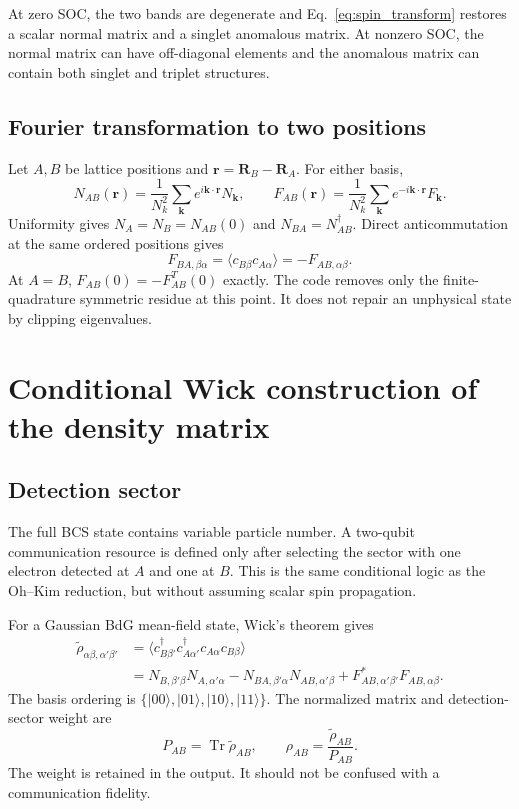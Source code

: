 \documentclass[11pt]{article}
\newcommand{\tr}{\operatorname{Tr}}
\newcommand{\kb}{\mathbf k}
\newcommand{\rr}{\mathbf r}
\begin{document}
At zero SOC, the two bands are degenerate and Eq.~\eqref{eq:spin_transform} restores a scalar normal matrix and a singlet anomalous matrix. At nonzero SOC, the normal matrix can have off-diagonal elements and the anomalous matrix can contain both singlet and triplet structures.

\subsection{Fourier transformation to two positions}

Let $A,B$ be lattice positions and $\rr=\mathbf R_B-\mathbf R_A$. For either basis,
\begin{equation}
N_{AB}(\rr)=\frac1{N_k^2}\sum_{\kb}e^{i\kb\cdot\rr}N_{\kb},
\qquad
F_{AB}(\rr)=\frac1{N_k^2}\sum_{\kb}e^{-i\kb\cdot\rr}F_{\kb}.
\label{eq:real_space}
\end{equation}
Uniformity gives $N_A=N_B=N_{AB}(0)$ and $N_{BA}=N_{AB}^{\dagger}$. Direct anticommutation at the same ordered positions gives
\begin{equation}
F_{BA,\beta\alpha}=\langle c_{B\beta}c_{A\alpha}\rangle=-F_{AB,\alpha\beta}.
\label{eq:FBA}
\end{equation}
At $A=B$, $F_{AB}(0)=-F_{AB}^{T}(0)$ exactly. The code removes only the finite-quadrature symmetric residue at this point. It does not repair an unphysical state by clipping eigenvalues.

\section{Conditional Wick construction of the density matrix}
\label{sec:wick}

\subsection{Detection sector}

The full BCS state contains variable particle number. A two-qubit communication resource is defined only after selecting the sector with one electron detected at $A$ and one at $B$. This is the same conditional logic as the Oh--Kim reduction, but without assuming scalar spin propagation.

For a Gaussian BdG mean-field state, Wick's theorem gives
\begin{align}
\widetilde\rho_{\alpha\beta,\alpha'\beta'}
&=\langle c_{B\beta'}^{\dagger}c_{A\alpha'}^{\dagger}
 c_{A\alpha}c_{B\beta}\rangle\nonumber\\
&=N_{B,\beta'\beta}N_{A,\alpha'\alpha}
-N_{BA,\beta'\alpha}N_{AB,\alpha'\beta}
+F_{AB,\alpha'\beta'}^{*}F_{AB,\alpha\beta}.
\label{eq:wick_full}
\end{align}
The basis ordering is $\{|00\rangle,|01\rangle,|10\rangle,|11\rangle\}$. The normalized matrix and detection-sector weight are
\begin{equation}
P_{AB}=\tr\widetilde\rho_{AB},
\qquad
\rho_{AB}=\frac{\widetilde\rho_{AB}}{P_{AB}}.
\label{eq:normalization}
\end{equation}
The weight is retained in the output. It should not be confused with a communication fidelity.
\end{document}
